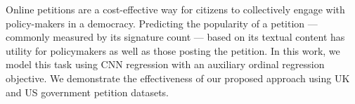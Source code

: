 Online petitions are a cost-effective way for citizens to collectively engage with policy-makers in a democracy. Predicting the popularity of a petition — commonly measured by its signature count — based on its textual content has utility for policymakers as well as those posting the petition. In this work, we model this task using CNN regression with an auxiliary ordinal regression objective. We demonstrate the effectiveness of our proposed approach using UK and US government petition datasets.
